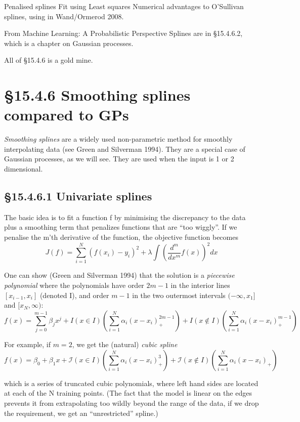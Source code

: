 \documentclass{amsart}
\begin{document}
Penalised splines
Fit using Least squares
Numerical advantages to O'Sullivan splines, using in Wand/Ormerod 2008.

From Machine Learning: A Probabilistic Perspective
Splines are in \S 15.4.6.2, which is a chapter on Gaussian processes.

All of \S 15.4.6 is a gold mine.

\section{\S 15.4.6 Smoothing splines compared to GPs}
\emph{Smoothing splines} are a widely used non-parametric method for smoothly interpolating
data (see Green and Silverman 1994). They are a special case of Gaussian processes, as we
will see. They are used when the input is 1 or 2 dimensional.

\subsection{\S 15.4.6.1 Univariate splines}
The basic idea is to fit a function f by minimising the discrepancy to the data plus a
smoothing term that penalizes functions that are ``too wiggly''. If we penalise the
m'th derivative of the function, the objective function becomes
\[
J(f) = \sum_{i=1}^N (f(x_i) - y_i)^2 + \lambda \int \left(\frac{d^m}{dx^m} f(x)\right)^2 dx
\]

One can show (Green and Silverman 1994) that the solution is a \emph{piecewise polynomial}
where the polynomials have order $2m - 1$ in the interior lines $[x_{i-1}, x_i]$ (denoted I),
and order $m - 1$ in the two outermost intervals $(-\infty, x_1]$ and $[x_N, \infty)$:
\[
f(x) = \sum_{j=0}^{m-1} \beta_j x^j + I(x \in I)\left( \sum_{i=1}^N \alpha_i (x - x_i)^{2m - 1}_{+}\right) + I(x \notin I)\left(\sum_{i=1}^N \alpha_i (x - x_i)^{m-1}_{+}\right)
\]

For example, if $m=2$, we get the (natural) \emph{cubic spline}
\[
f(x) = \beta_0 + \beta_1 x + \mathcal{I}(x \in I)\left(\sum_{i=1}^N \alpha_i (x - x_i)^3_+ \right) +
\mathcal{I}(x \notin I) \left( \sum_{i=1}^N \alpha_i (x - x_i)_+ \right)
\]

which is a series of truncated cubic polynomials, where left hand sides are located at
each of the N training points. (The fact that the model is linear on the edges prevents it
from extrapolating too wildly beyond the range of the data, if we drop the requirement,
we get an ``unrestricted'' spline.)
\end{document}
